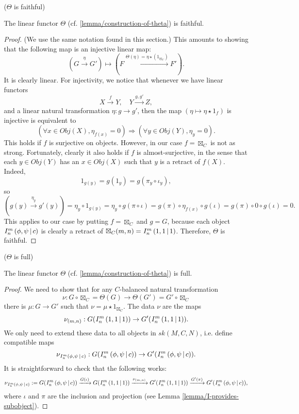 \begin{lemma}\label{lemma/theta-is-faithful} ($\Theta$ is faithful)

  \noindent The linear functor $\Theta$ (cf. \ref{lemma/construction-of-theta}) is faithful.
\end{lemma}

\begin{proof}
  (We use the same notation found in this section.) This amounts to showing
  that the following map is an injective linear map:
  \[
    (G \xrightarrow{\eta} G') \mapsto (F \xrightarrow{\Theta(\eta) = \eta \star (1_{\boxtimes_{C}})} F').
  \]
  It is clearly linear. For injectivity, we notice that whenever we have
  linear functors
  \[
    X \xrightarrow{f} Y,\quad Y \xrightarrow{g, g'} Z,
  \]
  and a linear natural transformation $\eta: g \to g'$, then the map $(\eta \mapsto \eta \star 1_{f})$ is injective is equivalent to
  \[
    (\forall x \in Obj(X), \eta_{f(x)} = 0) \Rightarrow (\forall y \in Obj(Y), \eta_{y} = 0).
  \]
  This holds if $f$ is surjective on objects. However, in our case
  $f = \boxtimes_{C}$ is not as strong. Fortunately, clearly it also holds if
  $f$ is almost-surjective, in the sense that each $y \in Obj(Y)$ has an
  $x \in Obj(X)$ such that $y$ is a retract of $f(X)$. Indeed,
  \[
    1_{g(y)} = g(1_{y}) = g(\pi_{y} \circ \iota_{y}),
  \]
  so
  \[
    (g(y) \xrightarrow{\eta_{y}} g'(y)) = \eta_{y} \circ 1_{g(y)} = \eta_{y} \circ g(\pi \circ \iota) = g(\pi) \circ \eta_{f(x)} \circ g(\iota) = g(\pi) \circ 0 \circ g(\iota) = 0.
  \]
  This applies to our case by putting $f = \boxtimes_{C}$ and $g = G$, because
  each object ${}^{}_{} I^{m}_{n} \left( \phi, \psi \,\middle|\, c \right)$ is clearly a retract of
  $\boxtimes_{C}(m,n) = {}^{}_{} I^{m}_{n} \left( 1, 1 \,\middle|\, 1 \right)$. Therefore, $\Theta$ is faithful.
\end{proof}

\begin{lemma}\label{lemma/theta-is-full} ($\Theta$ is full)

  \noindent The linear functor $\Theta$ (cf. \ref{lemma/construction-of-theta}) is full.
\end{lemma}

\begin{proof}
  We need to show that for any $C$-balanced natural transformation
  \[
    \nu: G \circ \boxtimes_{C} = \Theta(G) \to \Theta(G') = G' \circ \boxtimes_{C}
  \]
  there is $\mu: G \to G'$ such that $\nu = \mu \star 1_{\boxtimes_{C}}$. The data $\nu$ are the maps
  \[
    \nu_{(m,n)}: G({}^{}_{} I^{m}_{n} \left( 1, 1 \,\middle|\, 1 \right)) \to G'({}^{}_{} I^{m}_{n} \left( 1, 1 \,\middle|\, 1 \right)).
  \]
  We only need to extend these data to all objects in $sk(M,C,N)$, i.e. define compatible maps
  \[
    \nu_{{}^{}_{} I^{m}_{n} \left( \phi, \psi \,\middle|\, c \right)}: G({}^{}_{} I^{m}_{n} \left( \phi, \psi \,\middle|\, c \right)) \to G'({}^{}_{} I^{m}_{n} \left( \phi, \psi \,\middle|\, c \right)).
  \]
  It is straightforward to check that the following works:
  \[
    \nu_{{}^{}_{} I^{m}_{n} \left( \phi, \psi \,\middle|\, c \right)}:= G({}^{}_{} I^{m}_{n} \left( \phi, \psi \,\middle|\, c \right))
    \xrightarrow{G(\iota)}
    G({}^{}_{} I^{m}_{n} \left( 1, 1 \,\middle|\, 1 \right))
    \xrightarrow{\nu_{(m,n)}}
    G'({}^{}_{} I^{m}_{n} \left( 1, 1 \,\middle|\, 1 \right))
    \xrightarrow{G'(\pi)}
    G'({}^{}_{} I^{m}_{n} \left( \phi, \psi \,\middle|\, c \right)),
  \]
  where $\iota$ and $\pi$ are the inclusion and projection (see
  Lemma \ref{lemma/I-provides-subobject}).
\end{proof}

